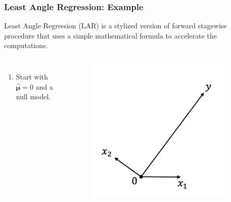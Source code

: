 \begin{frame}
\frametitle{Least Angle Regression: Example}
Least Angle Regression (LAR) is a stylized version of forward stagewise procedure that uses a simple mathematical formula to accelerate the computations.

\begin{columns}[t]
    \begin{enumerate}
        \item Start with $\hat{\mathbf{\mu}}=0$ and a null model.
    \end{enumerate}
    
    \begin{figure}[!htbp]
        \begin{center}
            \includegraphics[width=0.9\textwidth]{img/LAR/1.jpeg}
        \end{center}
    \end{figure}
\end{columns}
\end{frame}

